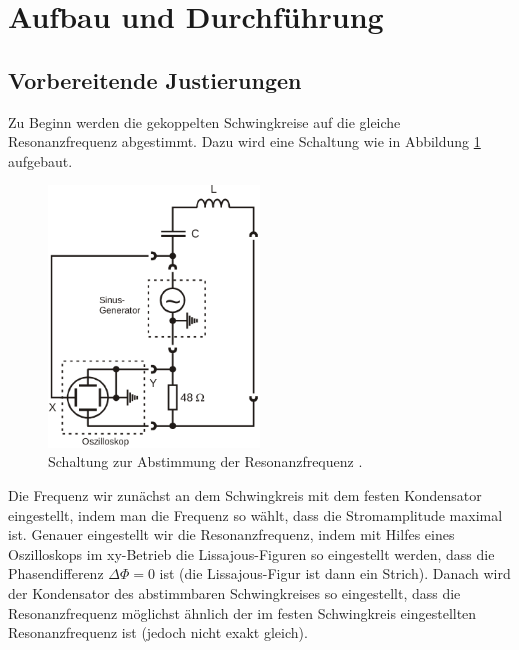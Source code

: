 \section{Aufbau und Durchführung}
\label{sec:Durchführung}
\subsection{Vorbereitende Justierungen}
Zu Beginn werden die gekoppelten Schwingkreise auf die gleiche Resonanzfrequenz
abgestimmt. Dazu wird eine Schaltung wie in Abbildung \ref{fig:abstimmung}
aufgebaut.
\begin{figure}
  \centering
  \includegraphics[width=0.5\textwidth]{abstimmung_neu.png}
  \caption{Schaltung zur Abstimmung der Resonanzfrequenz \cite{sample}.}
  \label{fig:abstimmung}
\end{figure}
Die Frequenz wir zunächst an dem Schwingkreis mit dem festen Kondensator eingestellt,
indem man die Frequenz so wählt, dass die Stromamplitude maximal ist. Genauer
eingestellt wir die Resonanzfrequenz, indem mit Hilfes eines Oszilloskops im
xy-Betrieb die Lissajous-Figuren so eingestellt werden, dass die Phasendifferenz
$\Delta \Phi = 0$ ist (die Lissajous-Figur ist dann ein Strich). Danach wird der
Kondensator des abstimmbaren Schwingkreises so eingestellt, dass die Resonanzfrequenz
möglichst ähnlich der im festen Schwingkreis eingestellten Resonanzfrequenz ist
(jedoch nicht exakt gleich).

